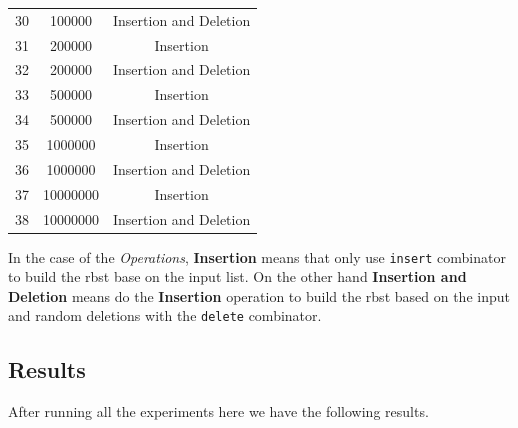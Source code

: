 \documentclass[12pt, a4paper]{article}
\begin{document}
\begin{table}[H]
\begin{tabular}{|c|c|c|}
      30 & 100000 & Insertion and Deletion \\
      31 & 200000 & Insertion \\
      32 & 200000 & Insertion and Deletion \\
      33 & 500000 & Insertion \\
      34 & 500000 & Insertion and Deletion \\
      35 & 1000000 & Insertion \\
      36 & 1000000 & Insertion and Deletion \\
      37 & 10000000 & Insertion \\
      38 & 10000000 & Insertion and Deletion \\
      \hline
    \end{tabular}
    \label{table:experiments_detail}
  \end{table}


  In the case of the \textit{Operations}, \textbf{Insertion} means that only use \lstinline[language=Haskell]!insert! combinator to build the \acrshort{rbst} base on the input list. On the other hand \textbf{Insertion and Deletion} means do the \textbf{Insertion} operation to build the \acrshort{rbst} based on the input and random deletions with the \lstinline[language=Haskell]!delete! combinator.

\subsection{Results}
After running all the experiments here we have the following results.
\end{document}
